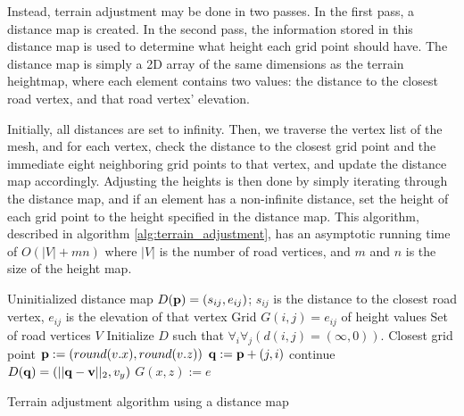 Instead, terrain adjustment may be done in two passes. In the first pass, a distance map is created. In the second pass, the information stored in this distance map is used to determine what height each grid point should have. The distance map is simply a 2D array of the same dimensions as the terrain heightmap, where each element contains two values: the distance to the closest road vertex, and that road vertex' elevation. 

Initially, all distances are set to infinity. Then, we traverse the vertex list of the mesh, and for each vertex, check the distance to the closest grid point and the immediate eight neighboring grid points to that vertex, and update the distance map accordingly. Adjusting the heights is then done by simply iterating through the distance map, and if an element has a non-infinite distance, set the height of each grid point to the height specified in the distance map. This algorithm, described in algorithm \ref{alg:terrain_adjustment}, has an asymptotic running time of $O(|V|+mn)$ where $|V|$ is the number of road vertices, and $m$ and $n$ is the size of the height map.

\begin{algorithm}
\begin{algorithmic}
\REQUIRE Uninitialized distance map $D({\mathbf p}) = (s_{ij}, e_{ij})$; $s_{ij}$ is the distance to the closest road vertex, $e_{ij}$ is the elevation of that vertex
\REQUIRE Grid $G(i,j) = e_{ij}$ of height values
\REQUIRE Set of road vertices $V$
\STATE Initialize $D$ such that $\forall_i\forall_j (d(i,j) = (\infty, 0))$. 
    \STATE Closest grid point ${\mathbf p} := (round(v.x), round(v.z))$
            \STATE ${\mathbf q} := {\mathbf p} + (j,i)$
                \STATE continue
            \ENDIF
                \STATE $D({\mathbf q}) = (||{\mathbf q}-{\mathbf v}||_2, v_y)$
            \ENDIF
        \ENDFOR
    \ENDFOR
\ENDFOR
{}
        \STATE $G(x,z) := e$
    \ENDIF
\ENDFOR
\end{algorithmic}
\caption{Terrain adjustment algorithm using a distance map}
\label{alg:terrain_adjustment}
\end{algorithm}


